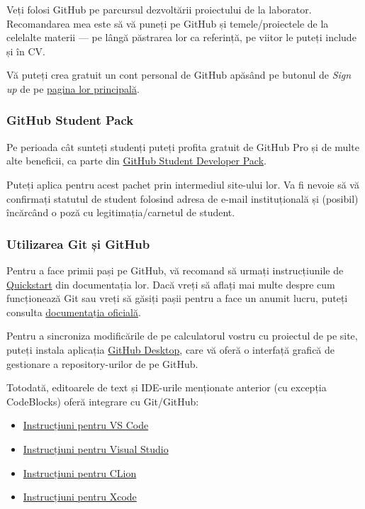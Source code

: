 Veți folosi GitHub pe parcursul dezvoltării proiectului de la laborator. Recomandarea mea este să vă puneți pe GitHub și temele/proiectele de la celelalte materii --- pe lângă păstrarea lor ca referință, pe viitor le puteți include și în CV.

Vă puteți crea gratuit un cont personal de GitHub apăsând pe butonul de \emph{Sign up} de pe \href{https://github.com/}{pagina lor principală}.

\subsubsection*{GitHub Student Pack}

Pe perioada cât sunteți studenți puteți profita gratuit de GitHub Pro și de multe alte beneficii, ca parte din \href{https://education.github.com/pack}{GitHub Student Developer Pack}.

Puteți aplica pentru acest pachet prin intermediul site-ului lor. Va fi nevoie să vă confirmați statutul de student folosind adresa de e-mail instituțională și (posibil) încărcând o poză cu legitimația/carnetul de student.

\subsubsection*{Utilizarea Git și GitHub}

Pentru a face primii pași pe GitHub, vă recomand să urmați instrucțiunile de \href{https://docs.github.com/en/get-started/quickstart/hello-world}{Quickstart} din documentația lor. Dacă vreți să aflați mai multe despre cum funcționează Git sau vreți să găsiți pașii pentru a face un anumit lucru, puteți consulta \href{https://git-scm.com/doc}{documentația oficială}.

Pentru a sincroniza modificările de pe calculatorul vostru cu proiectul de pe site, puteți instala aplicația \href{https://desktop.github.com/}{GitHub Desktop}, care vă oferă o interfață grafică de gestionare a repository-urilor de pe GitHub.

Totodată, editoarele de text și IDE-urile menționate anterior (cu excepția CodeBlocks) oferă integrare cu Git/GitHub:
\begin{itemize}
    \item \href{https://code.visualstudio.com/docs/sourcecontrol/overview}{Instrucțiuni pentru VS Code}
    \item \href{https://learn.microsoft.com/en-us/visualstudio/version-control/git-with-visual-studio?view=vs-2022}{Instrucțiuni pentru Visual Studio}
    \item \href{https://www.jetbrains.com/help/clion/using-git-integration.html}{Instrucțiuni pentru CLion}
    \item \href{https://developer.apple.com/documentation/xcode/configuring-your-xcode-project-to-use-source-control}{Instrucțiuni pentru Xcode}
\end{itemize}

